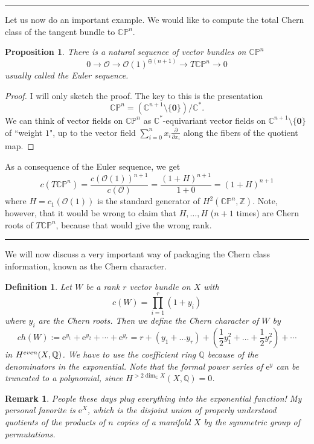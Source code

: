 \documentclass[11pt]{article}
\numberwithin{equation}{section}
\numberwithin{footnote}{section}
\newtheorem{prop}[thm]{Proposition}
\newtheorem{defn}[thm]{Definition}
\newtheorem{rem}[thm]{Remark}
\newcommand{\blue}{\color{blue}}
\newcommand{\red}{\color{red}}
\newcommand{\ee}{{\mathrm e}}
\renewcommand{\P}{{\mathbb P}}
\newcommand{\Q}{{\mathbb Q}}
\newcommand{\Z}{{\mathbb Z}}
\newcommand{\C}{{\mathbb C}}
\begin{document}
\smallskip
{\blue \hrule}
Let us now do an important example. We would like to compute the total Chern class of the tangent bundle to 
$\C\P^n$.

\smallskip
\begin{prop}\label{Euler}
There is a natural sequence of vector bundles on $\C\P^n$
$$
0\to \mathcal O \to \mathcal O(1)^{\oplus(n+1)}\to T\C\P^n \to 0
$$
usually called the {\blue Euler sequence}.
\end{prop}

\begin{proof}
I will only sketch the proof. The key to this is the presentation
$$
\C\P^n = (\C^{n+1}\setminus \{{\mathbf 0}\})/\C^*.
$$
We can think of vector fields on $\C\P^n$ as $\C^*$-equivariant vector fields on $\C^{n+1}\setminus \{{\mathbf 0}\}$ of ``weight $1$",
up to the vector field $\sum_{i=0}^{n} x_i \frac \partial{\partial x_i}$ along the fibers of the quotient map.
\end{proof}

As a consequence of the Euler sequence, we get 
$$
c(T\C\P^n) = \frac {c(\mathcal O(1))^{n+1}}{c(\mathcal O)} = \frac {(1+H)^{n+1}}{1+0} = (1+H)^{n+1}
$$
where $H=c_1(\mathcal O(1))$ is the standard generator of $H^2(\C\P^n,\Z)$.
Note, however, that it would be wrong to claim that $H,\ldots,H$ ($n+1$ times) are Chern roots of $T\C\P^n$, because that would give the wrong rank.

\smallskip
{\blue \hrule}
We will now discuss a very important way of packaging the Chern class information, known as the {\blue Chern character}.

\smallskip
\begin{defn}\label{ch}
Let $W$ be a rank $r$ vector bundle on $X$ with 
$$c(W)=\prod_{i=1}^r(1+y_i)$$
where $y_i$ are the Chern roots. Then we define the Chern character of $W$ by
$$
ch(W) := \ee^{y_1} + \ee^{y_2} + \cdots + \ee^{y_r}
= r + (y_1 + \ldots y_r) + (\frac 12 y_1^2 + \ldots + \frac 12 y_r^2) + \cdots
$$
in  $H^{\rm even}(X,\Q)$. We have to use the coefficient ring $\Q$ because of the denominators in the exponential. Note that the formal power series of $\ee^y$ can be truncated to a polynomial, since $H^{>2\dim_\C X}(X,\Q)=0$.
\end{defn}

\smallskip
\begin{rem}
People these days plug {\red everything} into the exponential function! My personal favorite is $\ee^X$, which is the disjoint union of properly understood quotients of the products of $n$ copies of a manifold $X$ by the symmetric group of permutations.
\end{rem}
\end{document}

